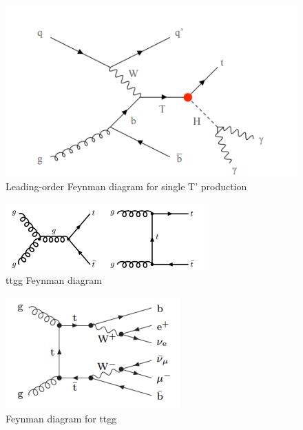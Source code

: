 \begin{figure}[H]
    \centering
    \includegraphics[scale=0.5]{figure_1/T'.png}
    \caption{Leading-order Feynman diagram for single T’ production}
    \label{fig:my_label_T'}
\end{figure}


\begin{figure}[H]
    \centering
    \includegraphics[scale=0.5]{figure_1/ttgg.png}
    \caption{ttgg Feynman diagram}
    \label{fig:my_label_ttgg}
\end{figure}

\begin{figure}[H]
    \centering
    \includegraphics[scale=0.5]{figure_1/ttgg__.png}
    \caption{Feynman diagram for ttgg}
    \label{fig:my_label_ttgg_12}
\end{figure}


